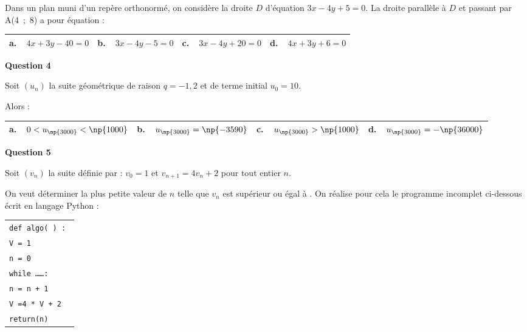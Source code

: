 Dans un plan muni d'un repère orthonormé, on considère la droite $D$ d'équation
$3x - 4y + 5 = 0$. La droite parallèle à $D$ et passant par A(4~;~8) a pour équation :

\begin{center}
\begin{tabularx}{\linewidth}{|*{4}{X|}}\hline
\textbf{a.~~}$4x +3y - 40 = 0$ &\textbf{b.~~}$3x - 4y - 5 = 0$&\textbf{c.~~}$3x - 4y +20 = 0$&\textbf{d.~~}$4x +3y +6 = 0$\\ \hline
\end{tabularx}
\end{center}

\medskip

\textbf{Question 4}

\medskip

Soit $\left(u_n\right)$ la suite géométrique de raison $q = - 1,2$ et de terme initial $u_0 = 10$. 

Alors :

\begin{center}
\begin{tabularx}{\linewidth}{|*{4}{X|}}\hline
\textbf{a.~~}$0< u_{\np{3000}} < \np{1000}$ &\textbf{b.~~}$u_{\np{3000}} = \np{- 3590}$&\textbf{c.~~}$u_{\np{3000}} > \np{1000}$&\textbf{d.~~}$u_{\np{3000}} = - \np{36000}$\\ \hline
\end{tabularx}
\end{center}

\medskip

\textbf{Question 5}

\medskip

Soit $\left(v_n\right)$ la suite définie par : $v_0 = 1$ et $v_{n+1} = 4v_n +2$ pour tout entier $n$.

On veut déterminer la plus petite valeur de $n$ telle que $v_n$ est supérieur ou égal
à . On réalise pour cela le programme incomplet ci-dessous écrit en langage
Python :

\begin{center}
\begin{tabular}{|l|}\hline
\texttt{def algo( ) : }\\
\qquad \texttt{V = 1}\\
\qquad \texttt{n = 0}\\
\qquad \texttt{while \ldots \ldots :}\\
\qquad \qquad \texttt{n = n + 1}\\
\qquad \qquad \texttt{V =4 * V + 2}\\
\qquad  \texttt{return(n)}\\ \hline
\end{tabular}
\end{center}

